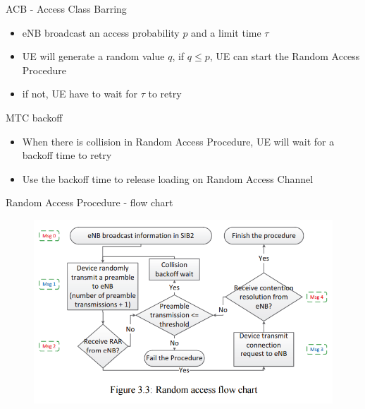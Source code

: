 \documentclass{beamer}
\begin{document}
\begin{frame}{ACB - Access Class Barring}
    \begin{itemize}
        \item{eNB broadcast an access probability $p$ and a limit time $\tau$}
        \item{UE will generate a random value $q$, if $q \leq p$, UE can start the Random Access Procedure}
        \item{if not, UE have to wait for $\tau$ to retry}
    \end{itemize}
\end{frame}

\begin{frame}{MTC backoff}
    \begin{itemize}
        \item{When there is collision in Random Access Procedure, UE will wait for a backoff time to retry}
        \item{Use the backoff time to release loading on Random Access Channel}
    \end{itemize}
\end{frame}

\begin{frame}{Random Access Procedure - flow chart}
    \begin{figure}[t]
        \centering
        \includegraphics[width=1\textwidth]{figures/flow.png}
    \end{figure}
\end{frame}


\end{document}

